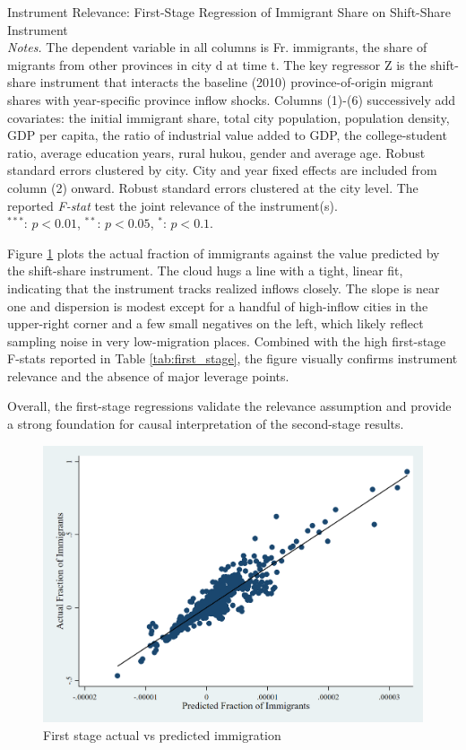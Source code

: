 \documentclass[12pt]{article}
\begin{document}
\begin{table}[htbp!]
  \centering 
  \resizebox{\textwidth}{!}{
    
  }
  \caption{Instrument Relevance: First-Stage Regression of Immigrant Share on Shift-Share Instrument \vspace{1ex} \\ 
  {\footnotesize \emph{Notes.} The dependent variable in all columns is Fr. immigrants, the share of migrants from other provinces in city d at time t. The key regressor Z is the shift-share instrument that interacts the baseline (2010) province-of-origin migrant shares with year-specific province inflow shocks. Columns (1)-(6) successively add covariates: the initial immigrant share, total city population, population density, GDP per capita, the ratio of industrial value added to GDP, the college-student ratio, average education years, rural hukou, gender and average age. Robust standard errors clustered by city. City and year fixed effects are included from column (2) onward. Robust standard errors clustered at the city level. The reported \emph{F-stat} test the joint relevance of the instrument(s). 
 \\ $^{***}$: $p < 0.01$, $^{**}$: $p < 0.05$, $^{*}$: $p < 0.1$.}}
 \label{tab:first_stage}
\end{table}

Figure \ref{fig:first_stage} plots the actual fraction of immigrants against the value predicted by the shift-share instrument. The cloud hugs a line with a tight, linear fit, indicating that the instrument tracks realized inflows closely. The slope is near one and dispersion is modest except for a handful of high-inflow cities in the upper-right corner and a few small negatives on the left, which likely reflect sampling noise in very low-migration places. 
Combined with the high first-stage F-stats reported in Table \ref{tab:first_stage}, the figure visually confirms instrument relevance and the absence of major leverage points.

Overall, the first-stage regressions validate the relevance assumption and provide a strong foundation for causal interpretation of the second-stage results.

\begin{figure}[htbp!]
  \centering
  \includegraphics[width=.6\textwidth]{../Analysis/output/First_stage_actual_vs_predicted_immigration.png}
  \caption{First stage actual vs predicted immigration}
  \label{fig:first_stage}
\end{figure}
\end{document}
